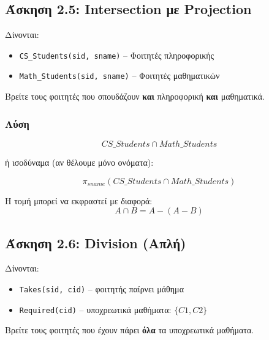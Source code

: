 \subsection{Άσκηση 2.5: Intersection με Projection}

\begin{formulabox}[Εκφώνηση]
Δίνονται:
\begin{itemize}
    \item \texttt{CS\_Students(sid, sname)} -- Φοιτητές πληροφορικής
    \item \texttt{Math\_Students(sid, sname)} -- Φοιτητές μαθηματικών
\end{itemize}

Βρείτε τους φοιτητές που σπουδάζουν \textbf{και} πληροφορική \textbf{και} μαθηματικά.
\end{formulabox}

\subsubsection*{Λύση}

$$CS\_Students \cap Math\_Students$$

ή ισοδύναμα (αν θέλουμε μόνο ονόματα):

$$\pi_{sname}(CS\_Students \cap Math\_Students)$$

\begin{infobox}[Ισοδυναμία]
Η τομή μπορεί να εκφραστεί με διαφορά:
$$A \cap B = A - (A - B)$$
\end{infobox}

\subsection{Άσκηση 2.6: Division (Απλή)}

\begin{formulabox}[Εκφώνηση]
Δίνονται:
\begin{itemize}
    \item \texttt{Takes(sid, cid)} -- φοιτητής παίρνει μάθημα
    \item \texttt{Required(cid)} -- υποχρεωτικά μαθήματα: $\{C1, C2\}$
\end{itemize}

Βρείτε τους φοιτητές που έχουν πάρει \textbf{όλα} τα υποχρεωτικά μαθήματα.
\end{formulabox}


